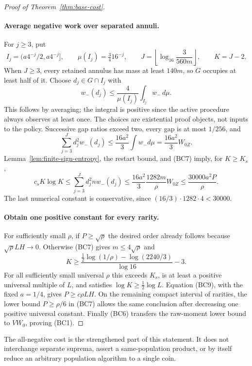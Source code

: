 \begin{proof}[Proof of Theorem~\ref{thm:base-cost}]
\paragraph{Average negative work over separated annuli.}
For $j\ge3$, put
\[
 I_j=(a4^{-j}/2,a4^{-j}],\qquad
 \mu(I_j)=\tfrac34 16^{-j},\qquad
 J=\left\lfloor\log_{16}\frac3{560m}\right\rfloor,
 \qquad K=J-2.
\]
When $J\ge3$, every retained annulus has mass at least $140m$, so
$G$ occupies at least half of it. Choose $d_j\in G\cap I_j$ with
\[
 w_-(d_j)\le\frac4{\mu(I_j)}\int_{I_j}w_-\,d\mu.
\]
This follows by averaging; the integral is positive since the active
procedure always observes at least once. The choices are existential
proof objects, not inputs to the policy. Successive gap ratios exceed
two, every gap is at most $1/256$, and
\[
 \sum_{j=3}^Jd_j^2w_-(d_j)
       \le\frac{16a^2}{3}\int w_-d\mu
       =\frac{16a^2}{3}W_{0Z}.
\]
Lemma~\ref{lem:finite-sign-entropy}, the restart bound, and (BC7) imply,
for $K\ge K_s$,
\[
 c_sK\log K
 \le\sum_{j=3}^Jd_j^2nw_-(d_j)
 \le\frac{16a^2}{3}\frac{1282m}{\rho}W_{0Z}
 \le\frac{30000a^2P}{\rho}.                            \tag{BC9}
\]
The last numerical constant is conservative, since
$(16/3)\cdot1282\cdot4<30000$.

\paragraph{Obtain one positive constant for every rarity.}
For sufficiently small $\rho$, if $P\ge\sqrt\rho$ the desired order
already follows because $\sqrt\rho LH\to0$. Otherwise (BC7) gives
$m\le4\sqrt\rho$ and
\[
 K\ge\frac{\tfrac12\log(1/\rho)-\log(2240/3)}{\log16}-3.
\]
For all sufficiently small universal $\rho$ this exceeds $K_s$, is at
least a positive universal multiple of $L$, and satisfies
$\log K\ge\tfrac12\log L$. Equation (BC9), with the fixed $a=1/4$,
gives $P\ge c\rho LH$. On the remaining compact interval of rarities,
the lower bound $P\ge\rho/6$ in (BC7) allows the same conclusion after
decreasing one positive universal constant. Finally (BC6) transfers the
raw-moment lower bound to $VW_0$, proving (BC1).
\end{proof}

The all-negative cost is the strengthened part of this statement. It
does not interchange separate suprema, assert a same-population product,
or by itself reduce an arbitrary population algorithm to a single coin.
